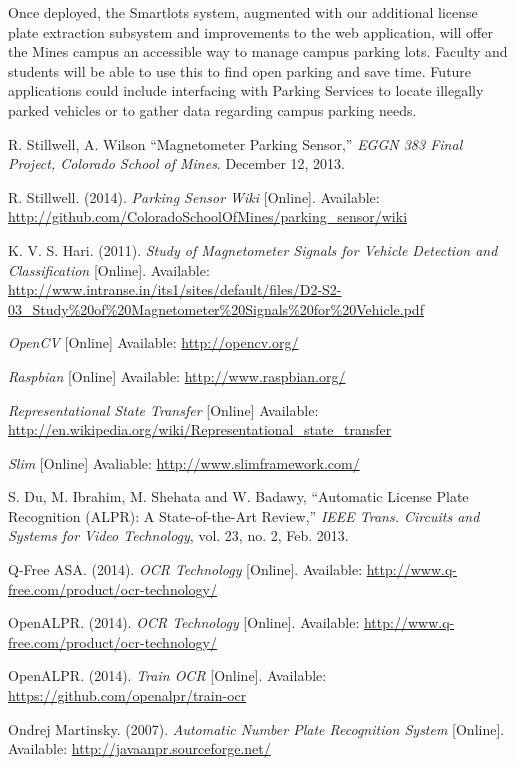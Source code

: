\documentclass[11pt, oneside, fullpage, doublespace]{article}
\begin{document}
Once deployed, the Smartlots system, augmented with our additional license plate extraction subsystem and improvements to the web application, will offer the Mines campus an accessible way to manage campus parking lots. Faculty and students will be able to use this to find open parking and save time. Future applications could include interfacing with Parking Services to locate illegally parked vehicles or to gather data regarding campus parking needs.

\begin{thebibliography}{99}
 R. Stillwell, A. Wilson ``Magnetometer Parking Sensor,'' \emph{EGGN 383 Final Project, Colorado School of Mines}. December 12, 2013.

 R. Stillwell. (2014). \emph{Parking Sensor Wiki} [Online]. Available: \url{http://github.com/ColoradoSchoolOfMines/parking_sensor/wiki}

 K. V. S. Hari. (2011). \emph{Study of Magnetometer Signals for Vehicle Detection and Classification} [Online]. Available: \url{http://www.intranse.in/its1/sites/default/files/D2-S2-03_Study\%20of\%20Magnetometer\%20Signals\%20for\%20Vehicle.pdf}

 \emph{OpenCV} [Online] Available: \url{http://opencv.org/}

 \emph{Raspbian} [Online] Available: \url{http://www.raspbian.org/}

 \emph{Representational State Transfer} [Online] Available: \url{http://en.wikipedia.org/wiki/Representational_state_transfer}

 \emph{Slim} [Online] Avaliable: \url{http://www.slimframework.com/}

 S. Du, M. Ibrahim, M. Shehata and W. Badawy, ``Automatic License Plate Recognition (ALPR): A State-of-the-Art Review,'' \emph{IEEE Trans. Circuits and Systems for Video Technology}, vol. 23, no. 2, Feb. 2013.

 Q-Free ASA. (2014). \emph{OCR Technology} [Online]. Available: \url{http://www.q-free.com/product/ocr-technology/}

 OpenALPR. (2014). \emph{OCR Technology} [Online]. Available: \url{http://www.q-free.com/product/ocr-technology/}

 OpenALPR. (2014). \emph{Train OCR} [Online]. Available: \url{https://github.com/openalpr/train-ocr}

 Ondrej Martinsky. (2007). \emph{Automatic Number Plate Recognition System} [Online]. Available: \url{http://javaanpr.sourceforge.net/}


\end{thebibliography}
\end{document}
